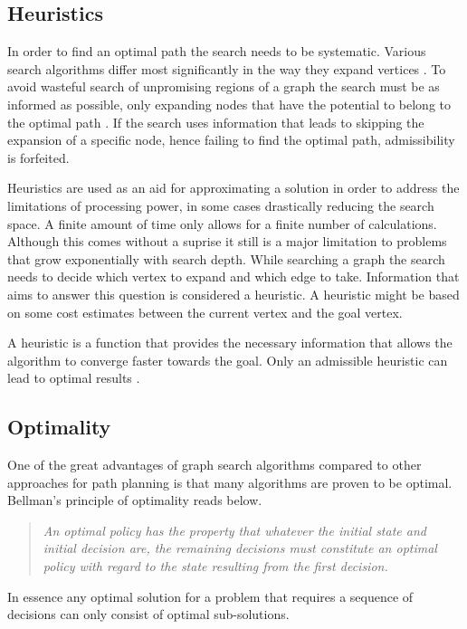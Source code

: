 \subsection{Heuristics}
In order to find an optimal path the search needs to be systematic. Various search algorithms differ most significantly in the way they expand vertices \cite{LaValle.2006}. To avoid wasteful search of unpromising regions of a graph the search must be as informed as possible, only expanding nodes that have the potential to belong to the optimal path \cite{Hart.1968}. If the search uses information that leads to skipping the expansion of a specific node, hence failing to find the optimal path, admissibility is forfeited.

Heuristics are used as an aid for approximating a solution in order to address the limitations of processing power, in some cases drastically reducing the search space. A finite amount of time only allows for a finite number of calculations. Although this comes without a suprise it still is a major limitation to problems that grow exponentially with search depth. While searching a graph the search needs to decide which vertex to expand and which edge to take. Information that aims to answer this question is considered a heuristic. A heuristic might be based on some cost estimates between the current vertex and the goal vertex. \cite{Newell.1976} 

A heuristic is a function that provides the necessary information that allows the algorithm to converge faster towards the goal. Only an admissible heuristic can lead to optimal results \cite{Hart.1968}.

\subsection{Optimality}
One of the great advantages of graph search algorithms compared to other approaches for path planning is that many algorithms are proven to be optimal. Bellman's principle of optimality reads below.
\begin{quotation}
    \noindent \emph{An optimal policy has the property that whatever the initial state and initial decision are, the remaining decisions must constitute an optimal policy with regard to the state resulting from the first decision.} \cite{Bellman.2003}
\end{quotation}

In essence any optimal solution for a problem that requires a sequence of decisions can only consist of optimal sub-solutions.

